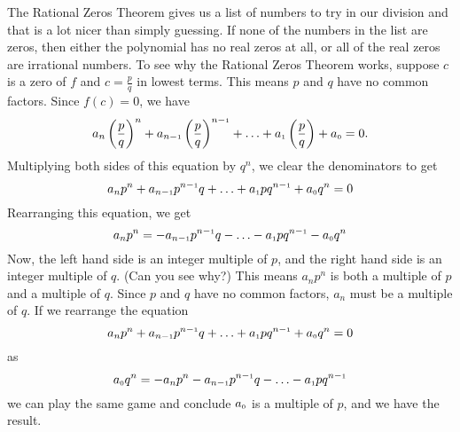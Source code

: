 
\smallskip


\smallskip

The Rational Zeros Theorem gives us a list of numbers to try in our  division and that is a lot nicer than simply guessing.  If none of the numbers in the list are zeros, then either the polynomial has no real zeros at all, or all of the real zeros are irrational numbers.  To see why the Rational Zeros Theorem works, suppose $c$ is a zero of $f$ and $c = \frac{p}{q}$ in lowest terms.  This means $p$ and $q$ have no common factors.  Since $f(c) = 0$, we have 
\[
a_{n} \left(\frac{p}{q}\right)^{n} + a_{n-\mbox{\tiny$1$}}\left(\frac{p}{q}\right)^{n-\mbox{\tiny$1$}} + \ldots + a_{\mbox{\tiny$1$}} \left(\frac{p}{q}\right) + a_{\mbox{\tiny$0$}} = 0.
\]  
Multiplying both sides of this equation by $q^n$, we clear the denominators to get 
\[
a_{n}p^{n} + a_{n-\mbox{\tiny$1$}}p^{n-\mbox{\tiny$1$}}q + \ldots + a_{\mbox{\tiny$1$}}p q^{n-\mbox{\tiny$1$}} + a_{\mbox{\tiny$0$}}q^n = 0
\]  
Rearranging this equation, we get  
\[
a_{n}p^{n} = -a_{n-\mbox{\tiny$1$}}p^{n-\mbox{\tiny$1$}}q - \ldots - a_{\mbox{\tiny$1$}}p q^{n-\mbox{\tiny$1$}} -a_{\mbox{\tiny$0$}}q^n
\] 
Now, the left hand side is an integer multiple of $p$, and the right hand side is an integer multiple of $q$. (Can you see why?)  This means $a_{n}p^{n}$ is both a multiple of $p$ and a multiple of $q$.  Since $p$ and $q$ have no common factors, $a_{n}$ must be a multiple of $q$.  If we rearrange the equation 
\[
a_{n}p^{n} + a_{n-\mbox{\tiny$1$}}p^{n-\mbox{\tiny$1$}}q + \ldots + a_{\mbox{\tiny$1$}}p q^{n-\mbox{\tiny$1$}} + a_{\mbox{\tiny$0$}}q^n = 0
\] 
as 
\[
a_{\mbox{\tiny$0$}}q^n = -a_{n}p^{n} - a_{n-\mbox{\tiny$1$}}p^{n-\mbox{\tiny$1$}}q - \ldots - a_{\mbox{\tiny$1$}}p q^{n-\mbox{\tiny$1$}}
\] 
we can play the same game and conclude $a_{\mbox{\tiny$0$}}$ is a multiple of $p$, and we have the result.

